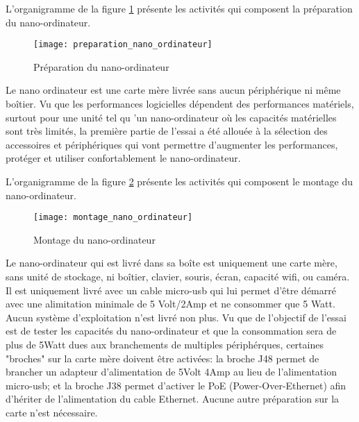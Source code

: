 \label{preparation_nano_ordinateur}
\par L'organigramme de la figure \ref{fig:preparation_nano_ordinateur} présente les activités qui composent la préparation du nano-ordinateur. 
\begin{figure}
    \centering
    \texttt{[image: preparation\_nano\_ordinateur]}
    \caption{Préparation du nano-ordinateur}
    \label{fig:preparation_nano_ordinateur}
\end{figure}
\par Le nano ordinateur est une carte mère livrée sans aucun périphérique ni même boîtier. Vu que les performances logicielles dépendent des performances matériels, surtout pour une unité tel qu 'un nano-ordinateur où les capacités matérielles sont très limités, la première partie de l'essai a été allouée à la sélection des accessoires et périphériques qui vont permettre d'augmenter les performances, protéger et utiliser confortablement le nano-ordinateur. 
\label{montage_nano_ordinateur}
\par L'organigramme de la figure \ref{fig:montage_nano_ordinateur} présente les activités qui composent le montage du nano-ordinateur. 
\begin{figure}
    \centering
    \texttt{[image: montage\_nano\_ordinateur]}
    \caption{Montage du nano-ordinateur}
    \label{fig:montage_nano_ordinateur}
\end{figure}
\par [TODO ajout photo] 
\par Le nano-ordinateur qui est livré dans sa boîte est uniquement une carte mère, sans unité de stockage, ni boîtier, clavier, souris, écran, capacité wifi, ou caméra. Il est uniquement livré avec un cable micro-usb qui lui permet d'être démarré avec une alimitation minimale de 5 Volt/2Amp et ne consommer que 5 Watt. Aucun système d'exploitation n'est livré non plus. Vu que de l'objectif de l'essai est de tester les capacités du nano-ordinateur et que la consommation sera de plus de 5Watt dues aux branchements de multiples périphérques, certaines "broches" sur la carte mère doivent être activées:  la broche J48 permet de brancher un adapteur d'alimentation de 5Volt 4Amp au lieu de l'alimentation micro-usb; et la broche J38 permet d'activer le PoE (Power-Over-Ethernet) afin d'hériter de l'alimentation du cable Ethernet. Aucune autre préparation sur la carte n'est nécessaire.
\par [TODO ajout photo] 
